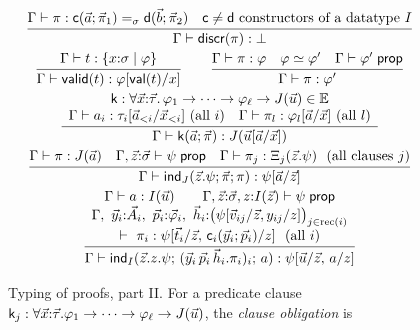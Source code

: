 \begin{figure}[tp]
\small
\[
\begin{array}{c}
\rul{\Gamma \vdash \pi :
       \wcns{c}(\tup{a};\tup{\pi}_1) =_{\sigma} \wcns{d}(\tup{b};\tup{\pi}_2)
     \quad \wcns{c} \neq \wcns{d} \text{ constructors of a datatype } I}
    {\Gamma \vdash \mathsf{discr}(\pi) : \bot}
\\[2.2ex]
\rul{\Gamma \vdash t : \refty{x{:}\sigma}{\varphi}}
    {\Gamma \vdash \tvalid{t} : \subst{\varphi}{\tval{t}}{x}}
\qquad
\rul{\Gamma \vdash \pi : \varphi \quad \varphi \conv \varphi' \quad
     \Gamma \vdash \varphi' \sprop}
    {\Gamma \vdash \pi : \varphi'}
\\[2.2ex]
\rul{\begin{array}{c}
     \wcns{k} : \forall \tup{x}{:}\tup{\tau}.\,\varphi_1 \to \dots \to
       \varphi_\ell \to J(\tup{u}) \in \Env \\
     \Gamma \vdash a_i : \subst{\tau_i}{\tup{a}_{<i}}{\tup{x}_{<i}} \
       (\text{all } i) \quad
     \Gamma \vdash \pi_l : \subst{\varphi_l}{\tup{a}}{\tup{x}} \ (\text{all } l)
     \end{array}}
    {\Gamma \vdash \wcns{k}(\tup{a}; \tup{\pi}) :
       J(\subst{\tup{u}}{\tup{a}}{\tup{x}})}
\\[2.2ex]
\rul{\Gamma \vdash \pi : J(\tup{a}) \quad
     \Gamma, \tup{z}{:}\tup{\sigma} \vdash \psi \sprop \quad
     \Gamma \vdash \pi_j : \Xi_j(\tup{z}.\psi) \ \ (\text{all clauses } j)}
    {\Gamma \vdash \tind{J}(\tup{z}.\psi; \tup{\pi}; \pi) :
       \subst{\psi}{\tup{a}}{\tup{z}}}
\\[2.2ex]
\rul{\begin{array}{c}
     \Gamma \vdash a : I(\tup{u}) \qquad
     \Gamma, \tup{z}{:}\tup{\sigma}, z{:}I(\tup{z}) \vdash \psi \sprop \\
     \Gamma,\ \tup{y}_i{:}\tup{A}_i,\ \tup{p}_i{:}\tup{\varphi}_i,\
       \tup{h}_i{:}\bigl(\psi[\tup{v}_{ij}/\tup{z},
       y_{ij}/z]\bigr)_{j \in \mathrm{rec}(i)} \\
       \vdash\ \pi_i :
       \psi[\tup{t}_i/\tup{z},\, \wcns{c}_i(\tup{y}_i;\tup{p}_i)/z]
       \ \ (\text{all } i)
     \end{array}}
    {\Gamma \vdash \tind{I}(\tup{z}.z.\psi;\,
       (\tup{y}_i\,\tup{p}_i\,\tup{h}_i.\pi_i)_i;\, a) :
       \psi[\tup{u}/\tup{z},\, a/z]}
\end{array}
\]
\caption{Typing of proofs, part II.  For a predicate clause
  $\mathsf{k}_j : \forall \vec{x}{:}\vec{\tau}.\varphi_1 \to \dots \to
  \varphi_\ell \to J(\vec{u})$, the \emph{clause obligation} is
}
\end{figure}
